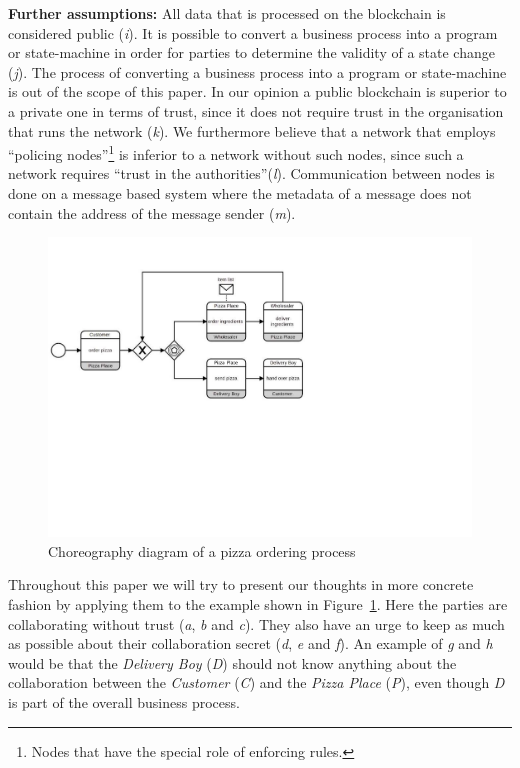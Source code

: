 \documentclass[runningheads]{llncs}
\newcommand{\ber}[1]{\textit{#1}}
\newcommand{\reffig}[1]{Figure~\ref{#1}}
\newcommand{\noteme}[1]{\todo{#1}}
\renewcommand{\bigbreak}{}
\newcommand{\quotel}{``}
\newcommand{\quoter}{''}
\begin{document}
\bigbreak
\textbf{Further assumptions:}
All data that is processed on the blockchain is considered public (\ber{i}). It is possible to convert a business process into a program or state-machine in order for parties to determine the validity of a state change (\ber{j}). The process of converting a business process into a program or state-machine is out of the scope of this paper. In our opinion a public blockchain is superior to a private one in terms of trust, since it does not require trust in the organisation that runs the network (\ber{k}). We furthermore believe that a network that employs \quotel  policing nodes\quoter \footnote{Nodes that have the special role of enforcing rules.} is inferior to a network without such nodes, since such a network requires \quotel trust in the authorities\quoter (\ber{l}). Communication between nodes is done on a message based system where the metadata of a message does not contain the address of the message sender (\ber{m}).

\begin{center}
\begin{figure}
    \centering
    \includegraphics[trim=0cm 9.5cm 11.5cm 2.4cm,clip=true,scale=0.65]{newbpmn.pdf}
    \caption{Choreography diagram of a pizza ordering process} 
    \label{fig:simple_bpmn}
\end{figure}
\end{center}


Throughout this paper we will try to present our thoughts in more concrete fashion by applying them to the example shown in \reffig{fig:simple_bpmn}. Here the parties are collaborating without trust (\ber{a}, \ber{b} and \ber{c}). They also have an urge to keep as much as possible about their collaboration secret (\ber{d}, \ber{e} and \ber{f}). An example of \ber{g} and \ber{h} would be that the \textit{Delivery Boy} (\ber{D})
 should not know anything about the collaboration between the \textit{Customer} (\ber{C}) and the \textit{Pizza Place} (\ber{P}), even though \ber{D} is part of the overall business process. 
\end{document}
